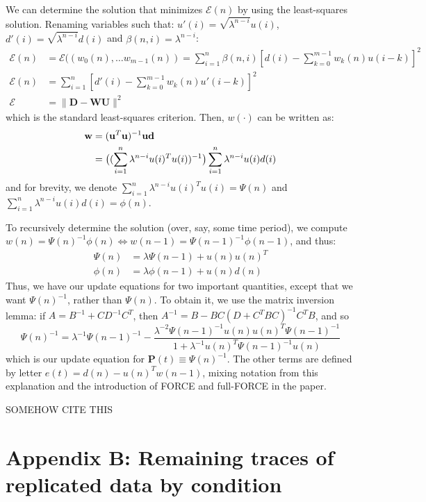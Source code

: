 \documentclass[12pt,a4paper,final]{iopart}
\begin{document}
We can determine the solution that minimizes $\mathcal{E}(n)$ by using the least-squares solution. Renaming variables such that: $u'(i) = \sqrt{\lambda^{n-i}}u(i)$, $d'(i) = \sqrt{\lambda^{n-i}}d(i)$ and $\beta(n,i) = \lambda^{n-i}$:
\begin{align*}
    \mathcal{E}(n) &= \mathcal{E}((w_0(n), \dots w_{m-1}(n)) = \sum_{i = 1}^n \beta(n, i)[d(i) - \sum_{k = 0}^{m - 1}w_k(n)u(i-k)]^2 \\
    \mathcal{E}(n) &= \sum_{i = 1}^n [d'(i) - \sum_{k=0}^{m-1}w_k(n)u'(i-k)]^2 \\
    \boldsymbol{\mathcal{E}} &= \lVert \boldsymbol{D} - \boldsymbol{W} \boldsymbol{U} \rVert ^2
\end{align*}
which is the standard least-squares criterion. Then, $w(\cdot)$ can be written as:
\begin{align*}
    {\bf w} &= ({\bf u}^T {\bf u})^{-1} {\bf u} {\bf d} \\
    &=\big((\sum_{i=1}^n\lambda^{n-i}u(i)^Tu(i))^{-1}\big)\sum_{i=1}^n\lambda^{n-i}u(i)d(i) 
\end{align*}
and for brevity, we denote $\sum_{i=1}^n\lambda^{n-i}u(i)^Tu(i) = \Psi(n)$ and $\sum_{i=1}^n\lambda^{n-i}u(i)d(i) = \phi(n)$.

To recursively determine the solution (over, say, some time period), we compute $w(n) = \Psi(n)^{-1}\phi(n) \Leftrightarrow w(n-1) = \Psi(n-1)^{-1}\phi(n-1)$, and thus:
\begin{align*}
    \Psi(n) &= \lambda \Psi(n-1) + u(n)u(n)^T \\
    \phi(n) &= \lambda \phi(n-1) + u(n)d(n)
\end{align*}
Thus, we have our update equations for two important quantities, except that we want $\Psi(n)^{-1}$, rather than $\Psi(n)$. To obtain it, we use the matrix inversion lemma: if $A = B^{-1} + CD^{-1}C^T$, then $A^{-1} = B - BC(D + C^TBC)^{-1}C^TB$, and so
\[
    \Psi(n)^{-1} = \lambda^{-1}\Psi(n-1)^{-1} - \frac{\lambda^{-2}\Psi(n-1)^{-1}u(n)u(n)^T\Psi(n-1)^{-1}}{1+\lambda^{-1} u(n)^T\Psi(n-1)^{-1}u(n)}
\]
which is our update equation for $\boldsymbol{P}(t) \equiv \Psi(n)^{-1}$. The other terms are defined by letter $e(t) = d(n) - u(n)^Tw(n-1)$, mixing notation from this explanation and the introduction of FORCE and full-FORCE in the paper.

SOMEHOW CITE THIS

\newpage

\section*{Appendix B: Remaining traces of replicated data by condition}
\end{document}
